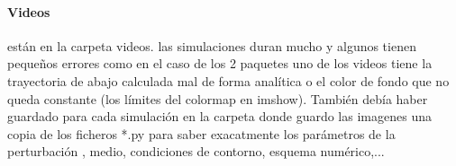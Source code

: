 \documentclass{article}
\begin{document}
\paragraph{Videos}
\begin{description}
\item están en la carpeta videos. las simulaciones duran mucho y algunos tienen pequeños errores como en el caso de los  2 paquetes uno de los videos tiene la trayectoria de abajo calculada mal de forma analítica o el color de fondo que no queda constante (los límites del colormap en imshow). También debía haber guardado para cada simulación en la carpeta donde guardo las imagenes una copia de los ficheros *.py para saber exacatmente los parámetros de la perturbación , medio, condiciones de contorno,  esquema numérico,...
\end{description}
\end{document}
